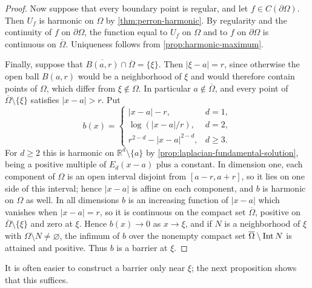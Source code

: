 \begin{proof}
Now suppose that every boundary point is regular, and let $f\in C(\partial\Omega)$. Then $U_f$ is harmonic on $\Omega$ by \cref{thm:perron-harmonic}. By regularity and the continuity of $f$ on $\partial\Omega$, the function equal to $U_f$ on $\Omega$ and to $f$ on $\partial\Omega$ is continuous on $\overline\Omega$. Uniqueness follows from \cref{prop:harmonic-maximum}.

Finally, suppose that $\overline{B(a,r)}\cap\overline\Omega=\{\xi\}$. Then $|\xi-a|=r$, since otherwise the open ball $B(a,r)$ would be a neighborhood of $\xi$ and would therefore contain points of $\Omega$, which differ from $\xi\notin\Omega$. In particular $a\notin\overline\Omega$, and every point of $\overline\Omega\setminus\{\xi\}$ satisfies $|x-a|>r$. Put
\[
 b(x)=\begin{cases}
 |x-a|-r,&d=1,\\
 \log(|x-a|/r),&d=2,\\
 r^{2-d}-|x-a|^{2-d},&d\geq3.
 \end{cases}
\]
For $d\geq2$ this is harmonic on $\mathbb R^d\setminus\{a\}$ by \cref{prop:laplacian-fundamental-solution}, being a positive multiple of $E_d(x-a)$ plus a constant. In dimension one, each component of $\Omega$ is an open interval disjoint from $[a-r,a+r]$, so it lies on one side of this interval; hence $|x-a|$ is affine on each component, and $b$ is harmonic on $\Omega$ as well. In all dimensions $b$ is an increasing function of $|x-a|$ which vanishes when $|x-a|=r$, so it is continuous on the compact set $\overline\Omega$, positive on $\overline\Omega\setminus\{\xi\}$ and zero at $\xi$. Hence $b(x)\to0$ as $x\to\xi$, and if $N$ is a neighborhood of $\xi$ with $\Omega\setminus N\neq\varnothing$, the infimum of $b$ over the nonempty compact set $\overline\Omega\setminus\operatorname{Int} N$ is attained and positive. Thus $b$ is a barrier at $\xi$.
\end{proof}

It is often easier to construct a barrier only near $\xi$; the next proposition shows that this suffices.

